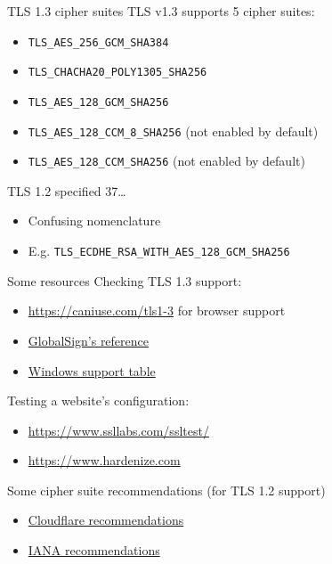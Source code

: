 \begin{frame}{TLS 1.3 cipher suites}
  TLS v1.3 supports 5 cipher suites:
  \pause
  \begin{itemize}
    \item {\small\texttt{TLS\_AES\_256\_GCM\_SHA384}}
    \item {\small\texttt{TLS\_CHACHA20\_POLY1305\_SHA256}}
    \item {\small\texttt{TLS\_AES\_128\_GCM\_SHA256}}
    \pause
    \item {\small\texttt{TLS\_AES\_128\_CCM\_8\_SHA256}} (not enabled by default)
    \item {\small\texttt{TLS\_AES\_128\_CCM\_SHA256}} (not enabled by default)
  \end{itemize}

  \pause
  TLS 1.2 specified 37\dots
  \begin{itemize}[<+(1)->]
    \item Confusing nomenclature
    \item E.g. {\small\texttt{TLS\_ECDHE\_RSA\_WITH\_AES\_128\_GCM\_SHA256}}
  \end{itemize}
\end{frame}

\begin{frame}{Some resources}
  Checking TLS 1.3 support:
  \begin{itemize}
    \item {\small\url{https://caniuse.com/tls1-3}} for browser support
    \item \href{https://support.globalsign.com/ssl/general-ssl/tls-protocol-compatibility}{GlobalSign's reference}
    \item \href{https://learn.microsoft.com/en-us/windows/win32/secauthn/protocols-in-tls-ssl--schannel-ssp-}{Windows support table}
  \end{itemize}

  \pause
  Testing a website's configuration:
  \begin{itemize}
    \item {\small\url{https://www.ssllabs.com/ssltest/}}
    \item {\small\url{https://www.hardenize.com}}
  \end{itemize}

  \pause
  Some cipher suite recommendations (for TLS 1.2 support)
  \begin{itemize}
    \item \href{https://developers.cloudflare.com/ssl/reference/cipher-suites/recommendations/}{Cloudflare recommendations}
    \item \href{https://www.iana.org/assignments/tls-parameters/tls-parameters.xhtml?ref=hackernoon.com\#tls-parameters-4}{IANA recommendations}
  \end{itemize}
\end{frame}

